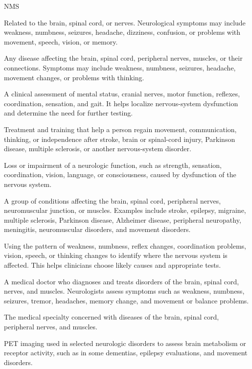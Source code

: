 \synonyms
NMS

 Related to the brain, spinal cord, or nerves. Neurological symptoms may include weakness, numbness, seizures, headache, dizziness, confusion, or problems with movement, speech, vision, or memory.

 Any disease affecting the brain, spinal cord, peripheral nerves, muscles, or their connections. Symptoms may include weakness, numbness, seizures, headache, movement changes, or problems with thinking.

 A clinical assessment of mental status, cranial nerves, motor function, reflexes, coordination, sensation, and gait.
It helps localize nervous-system dysfunction and determine the need for further testing.

 Treatment and training that help a person regain movement, communication, thinking, or independence after stroke, brain or spinal-cord injury, Parkinson disease, multiple sclerosis, or another nervous-system disorder.

 Loss or impairment of a neurologic function, such as strength, sensation, coordination, vision, language, or consciousness, caused by dysfunction of the nervous system.

 A group of conditions affecting the brain, spinal cord, peripheral nerves, neuromuscular junction, or muscles. Examples include stroke, epilepsy, migraine, multiple sclerosis, Parkinson disease, Alzheimer disease, peripheral neuropathy, meningitis, neuromuscular disorders, and movement disorders.

 Using the pattern of weakness, numbness, reflex changes, coordination problems, vision, speech, or thinking changes to identify where the nervous system is affected. This helps clinicians choose likely causes and appropriate tests.

 A medical doctor who diagnoses and treats disorders of the brain, spinal cord, nerves, and muscles. Neurologists assess symptoms such as weakness, numbness, seizures, tremor, headaches, memory change, and movement or balance problems.

 The medical specialty concerned with diseases of the brain, spinal cord, peripheral nerves, and muscles.

 PET imaging used in selected neurologic disorders to assess brain metabolism or receptor activity, such as in some dementias, epilepsy evaluations, and movement disorders.

